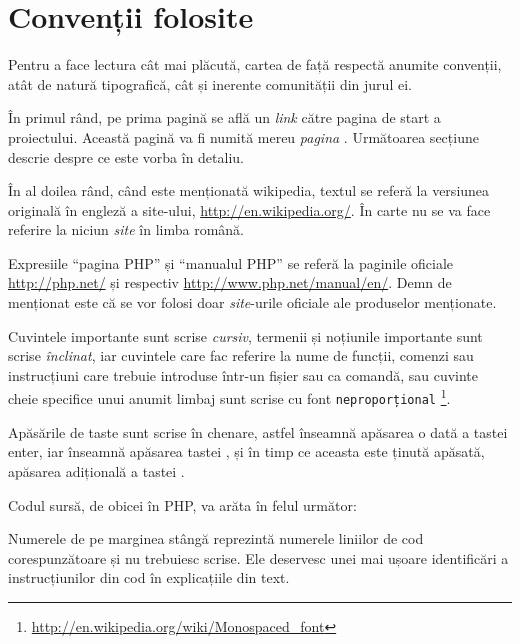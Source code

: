 \section*{Convenții folosite}
{}

Pentru a face lectura cât mai plăcută, cartea de față respectă anumite
convenții, atât de natură tipografică, cât și inerente comunității din jurul
ei.

În primul rând, pe prima pagină se află un \textit{link} către pagina de
start a proiectului. Această pagină va fi numită mereu \textit{pagina {\phpro}}.
Următoarea secțiune descrie despre ce este vorba în detaliu.

În al doilea rând, când este menționată wikipedia, textul se referă la
versiunea originală în engleză a site-ului, \url{http://en.wikipedia.org/}. În
carte nu se va face referire la niciun \textit{site} în limba română.

Expresiile ``pagina PHP'' și ``manualul PHP'' se referă la paginile oficiale
\url{http://php.net/} și respectiv \url{http://www.php.net/manual/en/}. Demn de
menționat este că se vor folosi doar \textit{site}-urile oficiale ale
produselor menționate.


Cuvintele importante sunt scrise \textit{cursiv}, termenii și noțiunile
importante sunt scrise \textsl{înclinat}, iar cuvintele care fac referire la
nume de funcții, comenzi sau instrucțiuni care trebuie introduse într-un fișier
sau ca comandă, sau cuvinte cheie specifice unui anumit limbaj sunt scrise cu
font
\texttt{neproporțional}%
\footnote{\url{http://en.wikipedia.org/wiki/Monospaced_font}}.

Apăsările de taste sunt scrise în chenare, astfel  înseamnă
apăsarea o dată a tastei enter, iar  înseamnă apăsarea tastei
, și în timp ce aceasta este ținută apăsată, apăsarea
adițională a tastei .

Codul sursă, de obicei în PHP, va arăta în felul următor:



Numerele de pe marginea stângă reprezintă numerele liniilor de cod
corespunzătoare și nu trebuiesc scrise. Ele deservesc unei mai ușoare
identificări a instrucțiunilor din cod în explicațiile din text.

